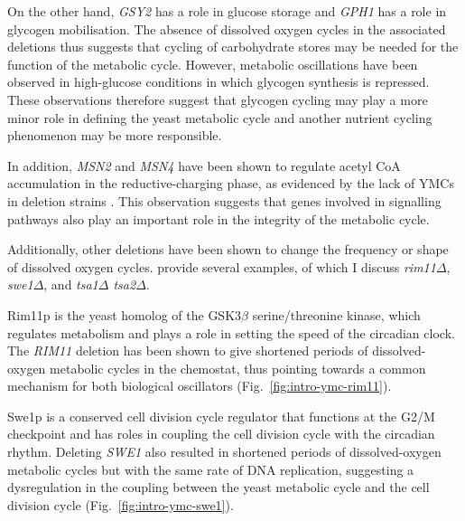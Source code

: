 On the other hand, \textit{GSY2} has a role in glucose storage and \textit{GPH1} has a role in glycogen mobilisation.
The absence of dissolved oxygen cycles in the associated deletions thus suggests that cycling of carbohydrate stores may be needed for the function of the metabolic cycle.
However, metabolic oscillations have been observed in high-glucose conditions \parencite{papagiannakisAutonomousMetabolicOscillations2017, baumgartnerFlavinbasedMetabolicCycles2018} in which glycogen synthesis is repressed.
These observations therefore suggest that glycogen cycling may play a more minor role in defining the yeast metabolic cycle and another nutrient cycling phenomenon may be more responsible.

In addition, \textit{MSN2} and \textit{MSN4} have been shown to regulate acetyl CoA accumulation in the reductive-charging phase, as evidenced by the lack of YMCs in deletion strains \parencite{kuangMsn2RegulateExpression2017}.
This observation suggests that genes involved in signalling pathways also play an important role in the integrity of the metabolic cycle.

Additionally, other deletions have been shown to change the frequency or shape of dissolved oxygen cycles.
\textcite{caustonMetabolicCyclesYeast2015} provide several examples, of which I discuss \textit{rim11$\Delta$}, \textit{swe1$\Delta$}, and \textit{tsa1$\Delta$ tsa2$\Delta$}. %

Rim11p is the yeast homolog of the GSK3$\beta$ serine/threonine kinase, which regulates metabolism and plays a role in setting the speed of the circadian clock.
The \textit{RIM11} deletion has been shown to give shortened periods of dissolved-oxygen metabolic cycles in the chemostat, thus pointing towards a common mechanism for both biological oscillators (Fig.\ \ref{fig:intro-ymc-rim11}).

Swe1p is a conserved cell division cycle regulator that functions at the G2/M checkpoint and has roles in coupling the cell division cycle with the circadian rhythm.
Deleting \textit{SWE1} also resulted in shortened periods of dissolved-oxygen metabolic cycles but with the same rate of DNA replication, suggesting a dysregulation in the coupling between the yeast metabolic cycle and the cell division cycle (Fig.\ \ref{fig:intro-ymc-swe1}).

